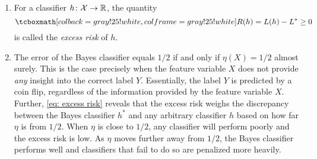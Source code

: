 \begin{remark}
    \begin{enumerate}
        \item For a classifier $h \colon \mathcal{X} \to \mathbb{R}$, the quantity
        \[
            \highlightMath{
                R(h) = L(h) - L^* \geq 0
            }
        \]
        is called the \emph{excess risk} of $h$.
        
        \item The error of the Bayes classifier equals $1/2$ if and only if $\eta(X) = 1/2$ almost surely. This is the case precisely when the feature variable $X$ does not provide \emph{any} insight into the correct label $Y$. Essentially, the label $Y$ is predicted by a coin flip, regardless of the information provided by the feature variable $X$. Further, \eqref{eq: excess risk} reveals that the excess risk weighs the discrepancy between the Bayes classifier $h^*$ and any arbitrary classifier $h$ based on how far $\eta$ is from $1/2$. When $\eta$ is close to $1/2$, any classifier will perform poorly and the excess risk is low. As $\eta$ moves further away from $1/2$, the Bayes classifier performs well and classifiers that fail to do so are penalized more heavily.
    \end{enumerate}
\end{remark}

